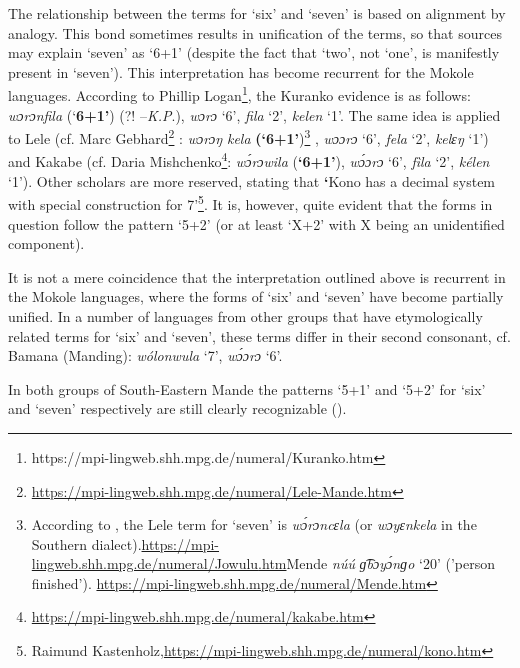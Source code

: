 The relationship between the terms for ‘six’ and ‘seven’ is based on alignment by analogy. This bond sometimes results in unification of the terms, so that sources may explain ‘seven’ as ‘6+1’ (despite the fact that ‘two’, not ‘one’, is manifestly present in ‘seven’). This interpretation has become recurrent for the Mokole languages. According to Phillip Logan\footnote{https://mpi-lingweb.shh.mpg.de/numeral/Kuranko.htm}, the Kuranko evidence is as follows: \textit{wɔrɔnfila} (‘\textbf{6+1'}) (?! –\textit{K.P}.), \textit{wɔrɔ} ‘6’, \textit{fila} ‘2’, \textit{kelen} ‘1’. The same idea is applied to Lele (cf. Marc  Gebhard\footnote{\href{https://mpi-lingweb.shh.mpg.de/numeral/Lele-Mande.htm}{https://mpi-lingweb.shh.mpg.de/numeral/Lele}\href{https://mpi-lingweb.shh.mpg.de/numeral/Lele-Mande.htm}{-Mande.htm}} : \textit{wɔrɔŋ} \textit{kela}\textbf{ (‘6+1'})\footnote{According to \citep{Vydrine2009}, the Lele term for ‘seven’ is \textit{w{\'{ɔ}}rɔncɛla} (or \textit{wɔyɛnkela} in the Southern dialect).\href{https://mpi-lingweb.shh.mpg.de/numeral/Jowulu.htm}{https://mpi-lingweb.shh.mpg.de/numeral/Jowulu}\href{https://mpi-lingweb.shh.mpg.de/numeral/Jowulu.htm}{.htm}Mende \textit{n{\'{u}}{\'{u}}} \textit{ɡ͡bɔy{\'{ɔ}}nɡo} `20' ('person finished'). \url{https://mpi-lingweb.shh.mpg.de/numeral/Mende.htm}} , \textit{wɔɔrɔ} ‘6’, \textit{fela} ‘2’, \textit{kelɛŋ} ‘1’) and Kakabe (cf. Daria Mishchenko\footnote{\href{https://mpi-lingweb.shh.mpg.de/numeral/Kakabe.htm}{https://mpi-lingweb.shh.mpg.de/numeral/kakabe.htm}}: \textit{w{\'{ɔ}}rɔwila} (\textbf{‘6+1'}), \textit{w{\'{ɔ}}ɔrɔ} ‘6’, \textit{fìla} ‘2’, \textit{kélen} ‘1’). Other scholars are more reserved, stating that \textbf{‘}Kono has a decimal system with special construction for 7’\footnote{Raimund Kastenholz,\href{https://mpi-lingweb.shh.mpg.de/numeral/Kono.htm}{https://mpi-lingweb.shh.mpg.de/numeral/kono.htm}}. It is, however, quite evident that the forms in question follow the pattern ‘5+2’ (or at least ‘X+2’ with X being an unidentified component).

It is not a mere coincidence that the interpretation outlined above is recurrent in the Mokole languages, where the forms of ‘six’ and ‘seven’ have become partially unified. In a number of languages from other groups that have etymologically related terms for ‘six’ and ‘seven’, these terms differ in their second consonant, cf. Bamana (Manding): \textit{wólonwula} ‘7’, \textit{w{\'{ɔ}}ɔrɔ} ‘6’.

In both groups of South-Eastern Mande the patterns ‘5+1’ and ‘5+2’ for ‘six’ and ‘seven’ respectively are still clearly recognizable ().

